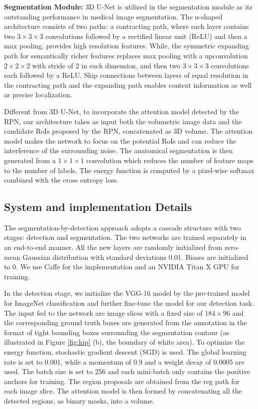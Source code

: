 \noindent\textbf{Segmentation Module:}
3D U-Net \cite{cciccek20163d} is utilized in the segmentation module as its outstanding performance in medical image segmentation. The u-shaped architecture consists of two paths: a contracting path, where each layer contains two $3\times3\times3$ convolutions followed by a rectified linear unit (ReLU) and then a max pooling, provides high resolution features. While, the symmetric expanding path for semantically richer features replaces max pooling with a upconvolution $2\times2\times2$ with stride of 2 in each dimension, and then two $3\times3\times3$ convolutions each followed by a ReLU. Skip connections between layers of equal resolution in the contracting path and the expanding path enables context information as well as precise localization.

Different from 3D U-Net, to incorporate the attention model detected by the RPN, our architecture takes as input both the volumetric image data and the candidate RoIs proposed by the RPN, concatenated as 3D volume. 
The attention model makes the network to focus on the potential RoIs and can reduce the interference of the surrounding noise.
The anatomical segmentation is then generated from a $1\times1\times1$ convolution which reduces the number of feature maps to the number of labels.  The energy function is computed by a pixel-wise softmax combined with the cross entropy loss.

\subsection{System and implementation Details}
The segmentation-by-detection approach adopts a cascade structure with two stages: detection and segmentation. The two networks are trained separately in an end-to-end manner. All the new layers are randomly initialized from zero-mean Gaussian distribution with standard deviations 0.01. Biases are initialized to 0. We use Caffe \cite{jia2014caffe} for the implementation and an NVIDIA Titan X GPU for training.

In the detection stage, we initialize the VGG-16 model by the pre-trained model for ImageNet classification \cite{russakovsky2015imagenet} and further fine-tune the model for our detection task. The input fed to the network are image slices with a fixed size of $184\times96$ and the corresponding ground truth boxes are generated from the annotation in the format of tight bounding boxes surrounding the segmentation contour (as illustrated in Figure \ref{fig:hip} (b), the boundary of white area). To optimize the energy function, stochastic gradient descent (SGD) is used. The global learning rate is set to 0.001, while a momentum of 0.9 and a weight decay of 0.0005 are used. The batch size is set to 256 and each mini-batch only contains the positive anchors for training. The region proposals are obtained from the reg path for each image slice. The attention model is then formed by concatenating all the detected regions, as binary masks, into a volume.

